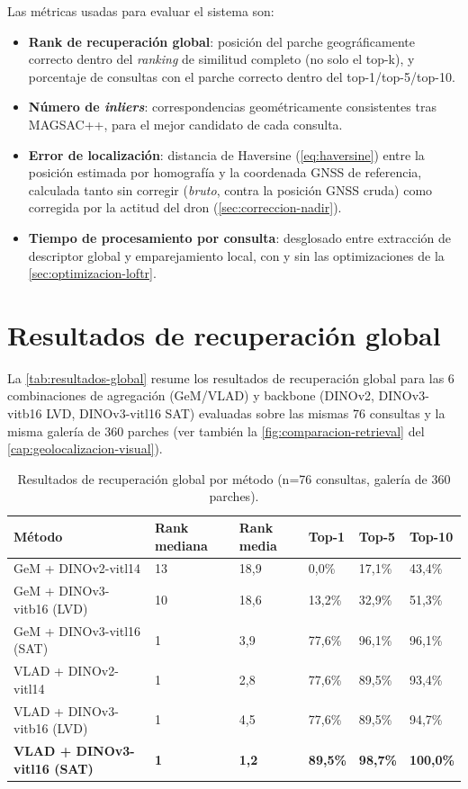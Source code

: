 Las métricas usadas para evaluar el sistema son:

\begin{itemize}
\item \textbf{Rank de recuperación global}: posición del parche geográficamente correcto dentro del \textit{ranking} de similitud completo (no solo el top-k), y porcentaje de consultas con el parche correcto dentro del top-1/top-5/top-10.
\item \textbf{Número de \textit{inliers}}: correspondencias geométricamente consistentes tras MAGSAC++, para el mejor candidato de cada consulta.
\item \textbf{Error de localización}: distancia de Haversine (\autoref{eq:haversine}) entre la posición estimada por homografía y la coordenada GNSS de referencia, calculada tanto sin corregir (\textit{bruto}, contra la posición GNSS cruda) como corregida por la actitud del dron (\autoref{sec:correccion-nadir}).
\item \textbf{Tiempo de procesamiento por consulta}: desglosado entre extracción de descriptor global y emparejamiento local, con y sin las optimizaciones de la \autoref{sec:optimizacion-loftr}.
\end{itemize}

\section{Resultados de recuperación global}
\label{sec:resultados-recuperacion-global}

La \autoref{tab:resultados-global} resume los resultados de recuperación global para las 6 combinaciones de agregación (GeM/VLAD) y backbone (DINOv2, DINOv3-vitb16 LVD, DINOv3-vitl16 SAT) evaluadas sobre las mismas 76 consultas y la misma galería de 360 parches (ver también la \autoref{fig:comparacion-retrieval} del \autoref{cap:geolocalizacion-visual}).

\begin{table}[htbp]
\centering
\caption{Resultados de recuperación global por método (n=76 consultas, galería de 360 parches).}
\label{tab:resultados-global}
\begin{tabularx}{\textwidth}{Xp{}p{}p{}p{}p{}}
\toprule
\textbf{Método} & \textbf{Rank mediana} & \textbf{Rank media} & \textbf{Top-1} & \textbf{Top-5} & \textbf{Top-10} \\
\midrule
GeM + DINOv2-vitl14           & 13 & 18,9 & 0,0\%   & 17,1\% & 43,4\% \\
GeM + DINOv3-vitb16 (LVD)     & 10 & 18,6 & 13,2\%  & 32,9\% & 51,3\% \\
GeM + DINOv3-vitl16 (SAT)     & 1  & 3,9  & 77,6\%  & 96,1\% & 96,1\% \\
VLAD + DINOv2-vitl14          & 1  & 2,8  & 77,6\%  & 89,5\% & 93,4\% \\
VLAD + DINOv3-vitb16 (LVD)    & 1  & 4,5  & 77,6\%  & 89,5\% & 94,7\% \\
\textbf{VLAD + DINOv3-vitl16 (SAT)} & \textbf{1} & \textbf{1,2} & \textbf{89,5\%} & \textbf{98,7\%} & \textbf{100,0\%} \\
\bottomrule
\end{tabularx}
\end{table}


